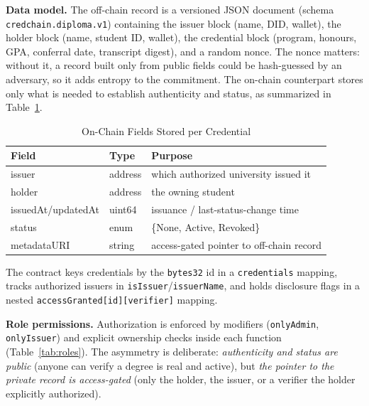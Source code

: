 \documentclass[conference]{IEEEtran}
\begin{document}
\textbf{Data model.} The off-chain record is a versioned JSON document (schema \texttt{credchain.diploma.v1}) containing the issuer block (name, DID, wallet), the holder block (name, student ID, wallet), the credential block (program, honours, GPA, conferral date, transcript digest), and a random nonce. The nonce matters: without it, a record built only from public fields could be hash-guessed by an adversary, so it adds entropy to the commitment. The on-chain counterpart stores only what is needed to establish authenticity and status, as summarized in Table~\ref{tab:onchain}.

\begin{table}[t]
\caption{On-Chain Fields Stored per Credential}
\label{tab:onchain}
\centering
\begin{tabular}{lll}
\hline
\textbf{Field} & \textbf{Type} & \textbf{Purpose}\\
\hline
issuer & address & which authorized university issued it\\
holder & address & the owning student\\
issuedAt/updatedAt & uint64 & issuance / last-status-change time\\
status & enum & \{None, Active, Revoked\}\\
metadataURI & string & access-gated pointer to off-chain record\\
\hline
\end{tabular}
\end{table}

The contract keys credentials by the \texttt{bytes32} id in a \texttt{credentials} mapping, tracks authorized issuers in \texttt{isIssuer}/\texttt{issuerName}, and holds disclosure flags in a nested \texttt{accessGranted[id][verifier]} mapping.

\textbf{Role permissions.} Authorization is enforced by modifiers (\texttt{onlyAdmin}, \texttt{onlyIssuer}) and explicit ownership checks inside each function (Table~\ref{tab:roles}). The asymmetry is deliberate: \emph{authenticity and status are public} (anyone can verify a degree is real and active), but \emph{the pointer to the private record is access-gated} (only the holder, the issuer, or a verifier the holder explicitly authorized).
\end{document}
